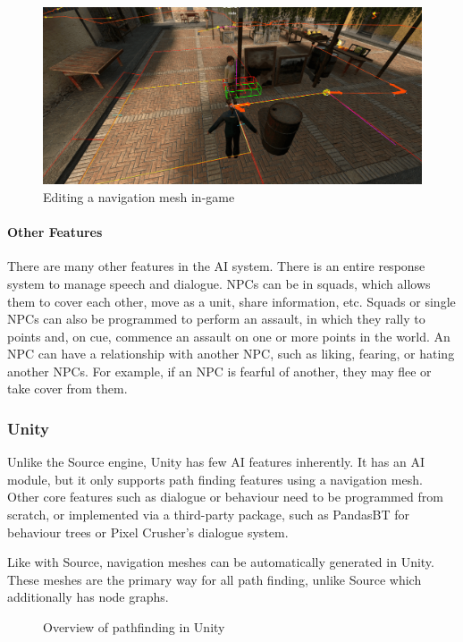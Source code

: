 \documentclass[a4paper, 12pt]{scrartcl}
\begin{document}
\begin{figure}[!htp]
  \centering
  \includegraphics[width=\linewidth]{images/source_nav_mesh.png}
  \caption{Editing a navigation mesh in-game}
  \label{fig:source_nav_mesh}
\end{figure}

\paragraph{Other Features}
There are many other features in the AI system. There is an entire response system to manage speech and dialogue. NPCs can be in squads, which allows them to cover each other, move as a unit, share information, etc. Squads or single NPCs can also be programmed to perform an assault, in which they rally to points and, on cue, commence an assault on one or more points in the world. An NPC can have a relationship with another NPC, such as liking, fearing, or hating another NPCs. For example, if an NPC is fearful of another, they may flee or take cover from them.

\subsubsection{Unity}
Unlike the Source engine, Unity has few AI features inherently. It has an AI module, but it only supports path finding features using a navigation mesh. Other core features such as dialogue or behaviour need to be programmed from scratch, or implemented via a third-party package, such as PandasBT for behaviour trees or Pixel Crusher's dialogue system.

Like with Source, navigation meshes can be automatically generated in Unity. These meshes are the primary way for all path finding, unlike Source which additionally has node graphs.

\begin{figure}[!htp]
  \centering
  
  \caption{Overview of pathfinding in Unity}
  \label{fig:unity_nav_loop}
\end{figure}
\end{document}
